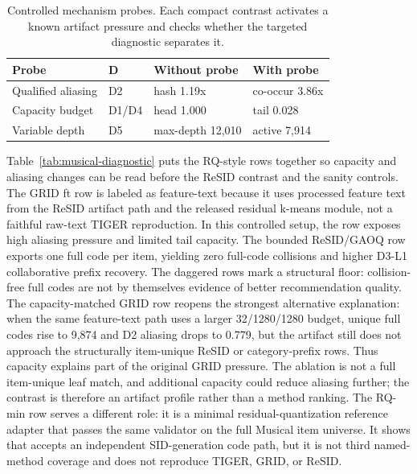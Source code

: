 \begin{table}[t]
\caption{Controlled mechanism probes. Each compact contrast activates a known
artifact pressure and checks whether the targeted diagnostic separates it.}
\label{tab:mechanism-probes}
\scriptsize
\setlength{\tabcolsep}{2pt}
\begin{tabularx}{\columnwidth}{@{}>{\raggedright\arraybackslash}p{}>{\centering\arraybackslash}p{}>{\raggedright\arraybackslash}X>{\raggedright\arraybackslash}X@{}}
\toprule
Probe & D & Without probe & With probe \\
\midrule
Qualified aliasing & D2 & hash 1.19x & co-occur 3.86x \\
Capacity budget & D1/D4 & head 1.000 & tail 0.028 \\
Variable depth & D5 & max-depth 12,010 & active 7,914 \\
\bottomrule
\end{tabularx}
\end{table}

Table~\ref{tab:musical-diagnostic} puts the RQ-style rows together so capacity
and aliasing changes can be read before the ReSID contrast and the sanity
controls. The GRID ft row is labeled as feature-text because it uses processed
feature text from the ReSID artifact path and the released residual k-means
module, not a faithful raw-text TIGER reproduction. In this controlled setup,
the row exposes high aliasing pressure and limited tail capacity. The bounded
ReSID/GAOQ row exports one full code per item, yielding zero full-code
collisions and higher D3-L1 collaborative prefix recovery. The daggered rows
mark a structural floor: collision-free full codes are not by themselves
evidence of better recommendation quality.
The capacity-matched GRID row reopens the strongest alternative explanation:
when the same feature-text path uses a larger
32/1280/1280 budget, unique full codes rise to 9,874 and D2 aliasing drops to
0.779, but the artifact still does not approach the structurally item-unique
ReSID or category-prefix rows. Thus capacity explains part of the original GRID
pressure. The ablation is not a full item-unique leaf match, and additional
capacity could reduce aliasing further; the contrast is therefore an artifact
profile rather than a method ranking. The RQ-min row serves a different role:
it is a minimal residual-quantization reference adapter that passes the same
validator on the full Musical item universe. It shows that \tool accepts an
independent SID-generation code path, but it is not third named-method coverage
and does not reproduce TIGER, GRID, or ReSID.

